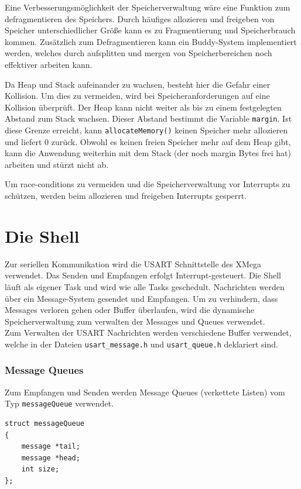 \documentclass[fontsize=12pt, toc=bibliography, notitlepage]{scrreprt}
\begin{document}
Eine Verbesserungsmöglichkeit der Speicherverwaltung wäre eine Funktion zum defragmentieren des Speichers. Durch häufiges allozieren und freigeben von Speicher unterschiedlicher Größe kann es zu Fragmentierung und Speicherbrauch kommen. Zusätzlich zum Defragmentieren kann ein Buddy-System implementiert werden, welches durch aufsplitten und mergen von Speicherbereichen noch effektiver arbeiten kann.

Da Heap und Stack aufeinander zu wachsen, besteht hier die Gefahr einer Kollision. Um dies zu vermeiden, wird bei Speicheranforderungen auf eine Kollision überprüft. Der Heap kann nicht weiter als bis zu einem festgelegten Abstand zum Stack wachsen. Dieser Abstand bestimmt die Variable \lstinline$margin$. Ist diese Grenze erreicht, kann \lstinline$allocateMemory()$ keinen Speicher mehr allozieren und liefert 0 zurück. Obwohl es keinen freien Speicher mehr auf dem Heap gibt, kann die Anwendung weiterhin mit dem Stack (der noch margin Bytes frei hat) arbeiten und stürzt nicht ab.

Um race-conditions zu vermeiden und die Speicherverwaltung vor Interrupts zu schützen, werden beim allozieren und freigeben Interrupts gesperrt.

\chapter{Die Shell}
\label{chap:die-shell}
Zur seriellen Kommunikation wird die USART Schnittstelle des XMega verwendet. Das Senden und Empfangen erfolgt Interrupt-gesteuert. Die Shell läuft als eigener Task und wird wie alle Tasks geschedult. Nachrichten werden über ein Message-System gesendet und Empfangen. Um zu verhindern, dass Messages verloren gehen oder Buffer überlaufen, wird die dynamische Speicherverwaltung zum verwalten der Messages und Queues verwendet. \\

Zum Verwalten der USART Nachrichten werden verschiedene Buffer verwendet, welche in der Dateien \lstinline$usart_message.h$ und \lstinline$usart_queue.h$ deklariert sind.

\subsection{Message Queues}
\label{subsec:shell-queue}
Zum Empfangen und Senden werden Message Queues (verkettete Listen) vom Typ \lstinline$messageQueue$ verwendet.

\begin{lstlisting}
struct messageQueue
{
	message *tail;
	message *head;
	int size;
};
\end{lstlisting}
\end{document}

